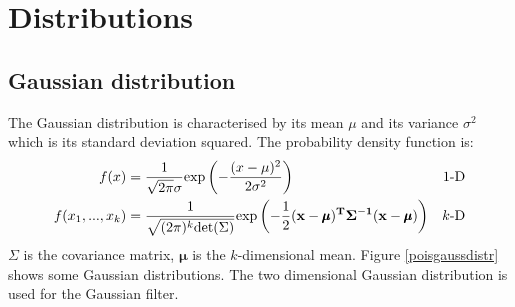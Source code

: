 \section{Distributions}
\subsection{Gaussian distribution}
The Gaussian distribution is characterised by its mean $\mu$ and its variance $\sigma^2$ which is its standard deviation squared. The probability density function is:
\begin{align}
f(x) &= \frac{1}{\sqrt{2\pi}\sigma}\text{exp}\left(-\frac{(x-\mu)^2}{2\sigma^2}\right)&\text{1-D}\\
f(x_1,...,x_k)&=\frac{1}{\sqrt{(2\pi)^k \text{det}(\Sigma)}}\text{exp}\left(-\frac{1}{2}(\bf{x}-\pmb{\mu})^T\Sigma^{-1}(\bf{x}-\pmb{\mu})\right) &\text{$k$-D}
\end{align}
$\Sigma$ is the covariance matrix, $\pmb{\mu}$ is the $k$-dimensional mean. Figure \ref{poisgaussdistr} shows some Gaussian distributions. The two dimensional Gaussian distribution is used for the Gaussian filter.

